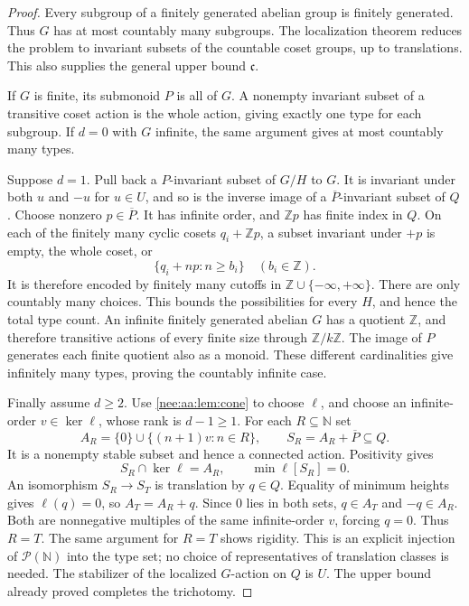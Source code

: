 \documentclass[11pt,letterpaper]{article}
\numberwithin{equation}{section}
\theoremstyle{plain}
\theoremstyle{definition}
\theoremstyle{remark}
\newcommand{\cont}{\mathfrak c}
\newcommand{\NN}{\mathbb N}
\newcommand{\ZZ}{\mathbb Z}
\begin{document}
\begin{proof}
Every subgroup of a finitely generated abelian group is finitely generated.
Thus $G$ has at most countably many subgroups. The localization theorem reduces
the problem to invariant subsets of the countable coset groups, up to
translations. This also supplies the general upper bound $\cont$.

If $G$ is finite, its submonoid $P$ is all of $G$. A nonempty invariant subset
of a transitive coset action is the whole action, giving exactly one type
for each subgroup. If $d=0$ with $G$ infinite, the same argument gives at most
countably many types.

Suppose $d=1$. Pull back a $P$-invariant subset of $G/H$ to $G$. It is invariant
under both $u$ and $-u$ for $u\in U$, and so is the inverse image of a
$\overline P$-invariant subset of $Q$. Choose nonzero $p\in\overline P$.
It has infinite order, and $\ZZ p$ has finite index in $Q$. On each of the
finitely many cyclic cosets $q_i+\ZZ p$, a subset invariant under $+p$ is
empty, the whole coset, or
\[
\{q_i+np:n\geq b_i\}\quad(b_i\in\ZZ).
\]
It is therefore encoded by finitely many cutoffs in
$\ZZ\cup\{-\infty,+\infty\}$. There are only countably many choices. This
bounds the possibilities for every $H$, and hence the total type count.
An infinite finitely generated abelian $G$ has a quotient $\ZZ$, and therefore
transitive actions of every finite size through $\ZZ/k\ZZ$. The image of $P$
generates each finite quotient also as a monoid. These different cardinalities
give infinitely many types, proving the countably infinite case.

Finally assume $d\geq2$. Use \cref{nee:aa:lem:cone} to choose $\ell$, and choose an
infinite-order $v\in\ker\ell$, whose rank is $d-1\geq1$. For each
$R\subseteq\NN$ set
\begin{equation}\label{nee:aa:eq:antichain}
A_R=\{0\}\cup\{(n+1)v:n\in R\},\qquad
S_R=A_R+\overline P\subseteq Q.
\end{equation}
It is a nonempty stable subset and hence a connected action. Positivity gives
\[
S_R\cap\ker\ell=A_R,\qquad\min\ell[S_R]=0.
\]
An isomorphism $S_R\to S_T$ is translation by $q\in Q$. Equality of minimum
heights gives $\ell(q)=0$, so $A_T=A_R+q$. Since $0$ lies in both sets,
$q\in A_T$ and $-q\in A_R$. Both are nonnegative multiples of the same
infinite-order $v$, forcing $q=0$. Thus $R=T$. The same argument for $R=T$
shows rigidity. This is an explicit injection of $\mathcal P(\NN)$ into the
type set; no choice of representatives of translation classes is needed.
The stabilizer of the localized $G$-action on $Q$ is $U$. The upper bound
already proved completes the trichotomy.
\end{proof}
\end{document}
